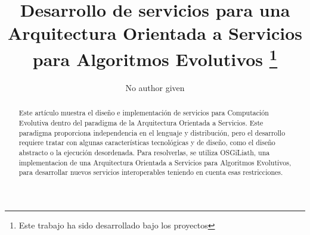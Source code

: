 \documentclass[runningheads]{llncs}
\begin{document}
\mainmatter  %



\title{Desarrollo de servicios para una Arquitectura Orientada a Servicios para Algoritmos Evolutivos \thanks{Este trabajo ha sido desarrollado bajo los proyectos 
}}

\author{No author given}

%







\maketitle
\begin{abstract}
Este artículo muestra el diseño e implementación de servicios para
Computación Evolutiva dentro del paradigma de la Arquitectura
Orientada a Servicios. Este paradigma proporciona independencia en el
lenguaje y distribución, pero el desarrollo requiere tratar con
algunas características tecnológicas y de diseño, como el diseño
abstracto o la ejecución desordenada. Para resolverlas, se utiliza
OSGiLiath, una implementacion de una Arquitectura Orientada a
Servicios para Algoritmos Evolutivos, para desarrollar nuevos
servicios interoperables teniendo en cuenta esas restricciones. %

\end{abstract}
\end{document}

